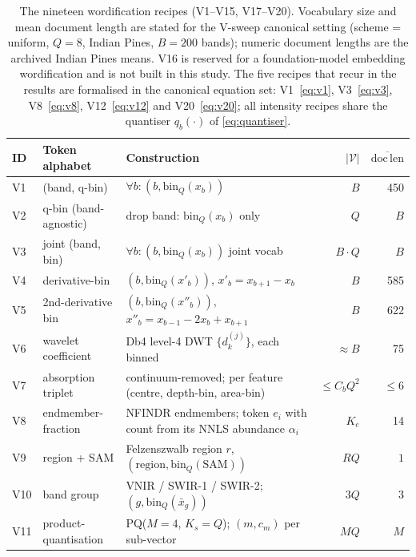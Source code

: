 \documentclass[journal,a4paper,10pt]{IEEEtran}
\begin{document}
\begin{table}[t]
\caption{The nineteen wordification recipes (V1--V15, V17--V20).
Vocabulary size and mean document length are stated for the V-sweep
canonical setting (scheme = uniform, $Q = 8$, Indian Pines,
$B = 200$ bands); numeric document lengths are the archived Indian
Pines means. V16 is reserved for a foundation-model embedding
wordification and is not built in this study. The five recipes
that recur in the results are formalised in the canonical equation set:
V1~\eqref{eq:v1}, V3~\eqref{eq:v3}, V8~\eqref{eq:v8}, V12~\eqref{eq:v12}
and V20~\eqref{eq:v20}; all intensity recipes share the quantiser
$q_b(\cdot)$ of \eqref{eq:quantiser}.}
\label{tab:recipes}
\centering
\small
\begin{tabular}{l>{\raggedright\arraybackslash}p{}>{\raggedright\arraybackslash}p{}rr}
\toprule
ID & Token alphabet & Construction & $|\mathcal{V}|$ & $\overline{\mathrm{doc\,len}}$ \\
\midrule
V1  & (band, q-bin)           & $\forall b: (b, \mathrm{bin}_Q(x_b))$ & $B$ & 450 \\
V2  & q-bin (band-agnostic)   & drop band: $\mathrm{bin}_Q(x_b)$ only & $Q$ & $B$ \\
V3  & joint (band, bin)       & $\forall b: (b, \mathrm{bin}_Q(x_b))$ joint vocab & $B \cdot Q$ & $B$ \\
V4  & derivative-bin          & $(b, \mathrm{bin}_Q(x'_b))$, $x'_b = x_{b+1} - x_b$ & $B$ & 585 \\
V5  & 2nd-derivative bin      & $(b, \mathrm{bin}_Q(x''_b))$, $x''_b = x_{b-1} - 2x_b + x_{b+1}$ & $B$ & 622 \\
V6  & wavelet coefficient     & Db4 level-4 DWT $\{d^{(j)}_k\}$, each binned & $\approx B$ & 75 \\
V7  & absorption triplet      & continuum-removed; per feature (centre, depth-bin, area-bin) & $\le C_b Q^2$ & $\le 6$ \\
V8  & endmember-fraction      & NFINDR endmembers; token $e_i$ with count from its NNLS abundance $\alpha_i$ & $K_e$ & 14 \\
V9  & region + SAM            & Felzenszwalb region $r$, $(\mathrm{region}, \mathrm{bin}_Q(\mathrm{SAM}))$ & $R Q$ & $1$ \\
V10 & band group              & VNIR / SWIR-1 / SWIR-2; $(g, \mathrm{bin}_Q(\bar{x}_g))$ & $3 Q$ & $3$ \\
V11 & product-quantisation    & PQ($M=4$, $K_s=Q$); $(m, c_m)$ per sub-vector & $M Q$ & $M$ \\

\end{tabular}
\end{table}
\end{document}
